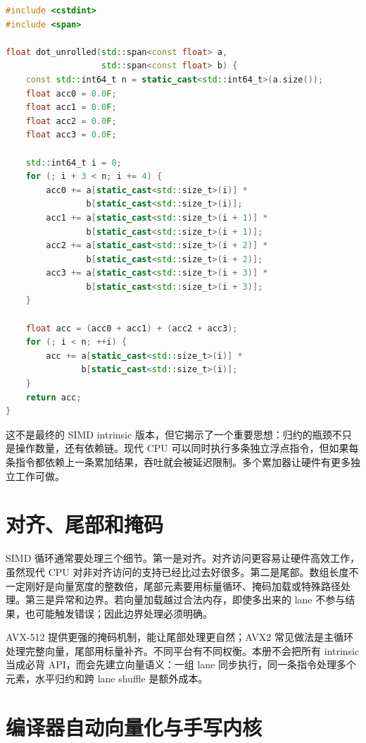 \begin{lstlisting}[language=C++,caption={教学版点积：多个累加器降低依赖链压力}]
#include <cstdint>
#include <span>

float dot_unrolled(std::span<const float> a,
                   std::span<const float> b) {
    const std::int64_t n = static_cast<std::int64_t>(a.size());
    float acc0 = 0.0F;
    float acc1 = 0.0F;
    float acc2 = 0.0F;
    float acc3 = 0.0F;

    std::int64_t i = 0;
    for (; i + 3 < n; i += 4) {
        acc0 += a[static_cast<std::size_t>(i)] *
                b[static_cast<std::size_t>(i)];
        acc1 += a[static_cast<std::size_t>(i + 1)] *
                b[static_cast<std::size_t>(i + 1)];
        acc2 += a[static_cast<std::size_t>(i + 2)] *
                b[static_cast<std::size_t>(i + 2)];
        acc3 += a[static_cast<std::size_t>(i + 3)] *
                b[static_cast<std::size_t>(i + 3)];
    }

    float acc = (acc0 + acc1) + (acc2 + acc3);
    for (; i < n; ++i) {
        acc += a[static_cast<std::size_t>(i)] *
               b[static_cast<std::size_t>(i)];
    }
    return acc;
}
\end{lstlisting}

这不是最终的 SIMD intrinsic 版本，但它揭示了一个重要思想：归约的瓶颈不只是操作数量，还有依赖链。现代 CPU 可以同时执行多条独立浮点指令，但如果每条指令都依赖上一条累加结果，吞吐就会被延迟限制。多个累加器让硬件有更多独立工作可做。

\section{对齐、尾部和掩码}

SIMD 循环通常要处理三个细节。第一是对齐。对齐访问更容易让硬件高效工作，虽然现代 CPU 对非对齐访问的支持已经比过去好很多。第二是尾部。数组长度不一定刚好是向量宽度的整数倍，尾部元素要用标量循环、掩码加载或特殊路径处理。第三是异常和边界。若向量加载越过合法内存，即使多出来的 lane 不参与结果，也可能触发错误；因此边界处理必须明确。

AVX-512 提供更强的掩码机制，能让尾部处理更自然；AVX2 常见做法是主循环处理完整向量，尾部用标量补齐。不同平台有不同权衡。本册不会把所有 intrinsic 当成必背 API，而会先建立向量语义：一组 lane 同步执行，同一条指令处理多个元素，水平归约和跨 lane shuffle 是额外成本。

\section{编译器自动向量化与手写内核}


